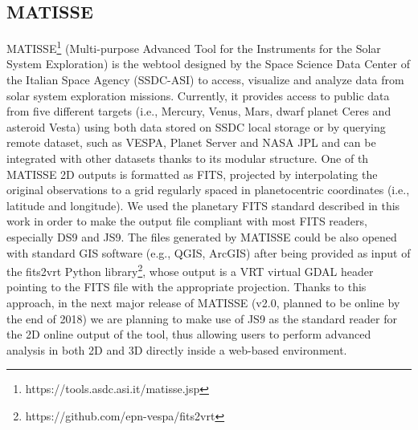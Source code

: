 \subsection{MATISSE}
MATISSE\footnote{https://tools.asdc.asi.it/matisse.jsp} (Multi-purpose Advanced Tool
for the Instruments for the Solar System Exploration) \citep{ZINZI2016} is the webtool
designed by the Space Science Data Center of the Italian Space Agency (SSDC-ASI) to
access, visualize and analyze data from solar system exploration missions.
Currently, it provides access to public data from five different targets (i.e., Mercury,
Venus, Mars, dwarf planet Ceres and asteroid Vesta) using both data stored on SSDC local
storage or by querying remote dataset, such as VESPA, Planet Server and NASA JPL and
can be integrated with other datasets thanks to its modular structure.
One of th MATISSE 2D outputs is formatted as FITS, projected by interpolating the
original observations to a grid regularly spaced
in planetocentric coordinates (i.e., latitude and longitude).
We used the planetary FITS standard described in this work in order to make the output
file compliant with most FITS readers, especially DS9 and JS9.
The files generated by MATISSE could be also opened with standard GIS software (e.g.,
QGIS, ArcGIS) 
after being provided as input of the fits2vrt Python library\footnote{https://github.com/epn-vespa/fits2vrt},
whose output is a VRT virtual GDAL header pointing to the FITS file with the appropriate
projection.
Thanks to this approach, in the next major release of MATISSE (v2.0, planned to be
online by the end of 2018) we are planning to make use of JS9 as the standard reader for
the 2D online output of the tool, thus allowing users to perform advanced analysis in
both 2D and 3D directly inside a web-based environment.

